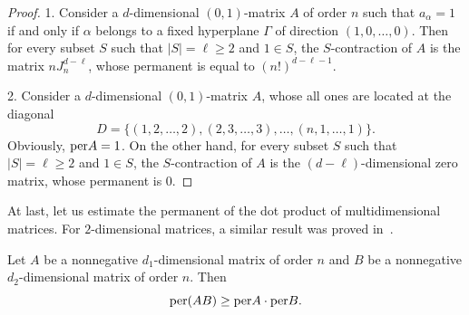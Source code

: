 \documentclass[a4paper]{article}
\begin{document}
\begin{proof}
1. Consider a $d$-dimensional $(0,1)$-matrix $A$ of order $n$ such that $a_{\alpha} = 1$ if and only if  $\alpha$ belongs to a fixed hyperplane $\Gamma$ of direction $(1, 0, \ldots, 0)$. Then for every subset $S$ such that  $|S| = \ell \geq 2$ and  $1 \in S$, the $S$-contraction of $A$ is  the matrix $n  J^{d-\ell}_n$, whose permanent is equal to $(n!)^{d-\ell-1}$. 

2. Consider a $d$-dimensional $(0,1)$-matrix $A$, whose all ones are located at the diagonal 
$$D = \{(1, 2, \ldots, 2), (2, 3,  \ldots, 3), \ldots, (n, 1, \ldots, 1) \}.$$
Obviously, ${\rm per} A = 1$. On the other hand, for  every subset $S$ such that  $|S| = \ell \geq 2$ and $1 \in S$, the $S$-contraction of $A$ is the $(d - \ell)$-dimensional zero matrix, whose permanent is $0$. 
\end{proof}


At last, let us estimate the permanent of the dot product of multidimensional matrices. For $2$-dimensional matrices, a similar result was proved in~\cite{brualdi.perdirprod}. 


\begin{teorema} \label{dotperm}
Let $A$ be a nonnegative $d_1$-dimensional matrix of order $n$ and $B$ be a nonnegative  $d_2$-dimensional matrix of order $n$. Then
$${\rm per} (A B) \geq {\rm per} A \cdot {\rm per} B.$$
\end{teorema}
\end{document}
